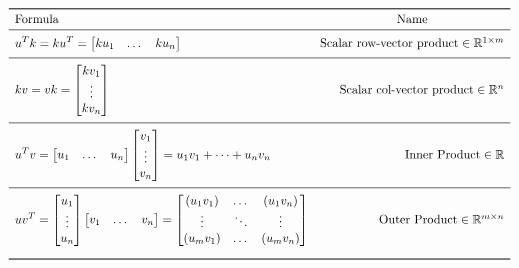 \documentclass[letterpaper,12pt]{article}
\begin{document}
\begin{table}[H]
\centering
\caption{Primitive Operations: Vector \{Scalar, Vector\} Products}
\label{tbl:2_1_1}
$\begin{array}{lr}
\toprule
\text{Formula} &
\multicolumn{1}{c}{\text{Name}}\\
\midrule
\addlinespace
  \begin{aligned}
    u^T k = k u^T
    =
    \begin{bmatrix}
        k u_1 & \dots & k u_n
    \end{bmatrix}
  \end{aligned} &
\text{Scalar row-vector product} \in \mathbb{R}^{1 \times m}
 \\
\addlinespace
\midrule
\addlinespace
  \begin{aligned}
    k v = v k
=
\begin{bmatrix}
    k v_1 \\ \vdots \\ k v_n
\end{bmatrix}
  \end{aligned} &
\text{Scalar col-vector product} \in \mathbb{R}^{n}
 \\
 \addlinespace
\midrule
\addlinespace
\begin{aligned}
u^T v
= 
\begin{bmatrix}
    u_1 & \dots & u_n
\end{bmatrix}
\begin{bmatrix}
    v_1 \\ \vdots \\ v_n
\end{bmatrix}
=
u_1 v_1 + \dots + u_n v_n
\end{aligned} & 
\text{Inner Product} \in \mathbb{R}
 \\
\addlinespace
\midrule
\addlinespace
\begin{aligned}
u v^T
= 
\begin{bmatrix}
    u_1 \\ \vdots \\ u_n
\end{bmatrix}
\begin{bmatrix}
    v_1 & \dots & v_n
\end{bmatrix}
=
\begin{bmatrix}
    (u_1 v_1) & \dots & (u_1 v_n) \\
    \vdots    & \ddots & \vdots \\
    (u_m v_1) & \dots &  (u_m v_n)
\end{bmatrix}
\end{aligned} & 
\text{Outer Product} \in \mathbb{R}^{m \times n}
 \\
\addlinespace
\addlinespace
\bottomrule
\end{array}$
\end{table}
\end{document}
